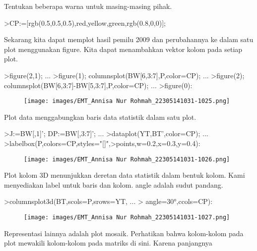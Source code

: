 \documentclass[a4paper,10pt]{article}
\begin{document}
\begin{eulernotebook}
\begin{eulercomment}
\begin{eulercomment}
\begin{eulercomment}
\begin{eulercomment}
\begin{figure}[h]
\end{figure}
\begin{eulercomment}
Tentukan beberapa warna untuk masing-masing pihak.
\end{eulercomment}
\begin{eulerprompt}
>CP:=[rgb(0.5,0.5,0.5),red,yellow,green,rgb(0.8,0,0)];
\end{eulerprompt}
\begin{eulercomment}
Sekarang kita dapat memplot hasil pemilu 2009 dan perubahannya ke
dalam satu plot menggunakan figure. Kita dapat menambahkan vektor
kolom pada setiap plot.
\end{eulercomment}
\begin{eulerprompt}
>figure(2,1);  ...
>figure(1); columnsplot(BW[6,3:7],P,color=CP); ...
>figure(2); columnsplot(BW[6,3:7]-BW[5,3:7],P,color=CP);  ...
>figure(0):
\end{eulerprompt}
\begin{figure}[h]
    \centering
    \texttt{[image: images/EMT\_Annisa Nur Rohmah\_22305141031-1025.png]}
\end{figure}
\begin{eulercomment}
Plot data menggabungkan baris data statistik dalam satu plot.
\end{eulercomment}
\begin{eulerprompt}
>J:=BW[,1]'; DP:=BW[,3:7]'; ...
>dataplot(YT,BT',color=CP);  ...
>labelbox(P,colors=CP,styles="[]",>points,w=0.2,x=0.3,y=0.4):
\end{eulerprompt}
\begin{figure}[h]
    \centering
    \texttt{[image: images/EMT\_Annisa Nur Rohmah\_22305141031-1026.png]}
\end{figure}
\begin{eulercomment}
Plot kolom 3D menunjukkan deretan data statistik dalam bentuk kolom.
Kami menyediakan label untuk baris dan kolom. angle adalah sudut
pandang.
\end{eulercomment}
\begin{eulerprompt}
>columnsplot3d(BT,scols=P,srows=YT, ...
>  angle=30°,ccols=CP):
\end{eulerprompt}
\begin{figure}[h]
    \centering
    \texttt{[image: images/EMT\_Annisa Nur Rohmah\_22305141031-1027.png]}
\end{figure}
\begin{eulercomment}
Representasi lainnya adalah plot mosaik. Perhatikan bahwa kolom-kolom
pada plot mewakili kolom-kolom pada matriks di sini. Karena panjangnya

\end{eulercomment}
\end{eulercomment}
\end{eulercomment}
\end{eulercomment}
\end{eulercomment}
\end{eulernotebook}
\end{document}
